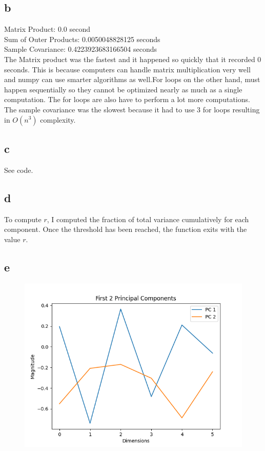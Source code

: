 \documentclass{article}
\begin{document}
\subsection{b}
Matrix Product: 0.0 second \\
Sum of Outer Products: 0.0050048828125 seconds \\
Sample Covariance: 0.4223923683166504 seconds \\

The Matrix product was the fastest and it happened so quickly that it recorded 0 seconds.
This is because computers can handle matrix multiplication very well and numpy can use smarter algorithms as well.For loops on the other hand, must happen sequentially so they cannot be optimized nearly as much as a single computation. The for loops are also have to perform a lot more computations. The sample covariance
was the slowest because it had to use 3 for loops resulting in $O(n^3)$ complexity.

\subsection{c} See code.

\subsection{d}
To compute $r$, I computed the fraction of total variance cumulatively for each component.
Once the threshold has been reached, the function exits with the value $r$.

\subsection{e}
\begin{figure}[h!]
  \includegraphics[width=\linewidth]{Figure_1.png}
\end{figure}
\end{document}
